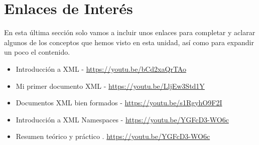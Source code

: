 \section{Enlaces de Interés}
En esta última sección solo vamos a incluir unos enlaces para completar y aclarar algunos de los conceptos que hemos visto en esta unidad, así como para expandir un poco el contenido.

\begin{itemize}
    \item Introducción a XML - \url{https://youtu.be/bCd2xaQrTAo}
    \item Mi primer documento XML - \url{https://youtu.be/LljEw3Std1Y}
    \item Documentos XML bien formados - \url{https://youtu.be/s1RgyhO9F2I}
    \item Introducción a XML Namespaces - \url{https://youtu.be/YGFcD3-WO6c}
    \item Resumen teórico y práctico . \url{https://youtu.be/YGFcD3-WO6c}
\end{itemize}



\glsaddall
\printglossaries


\newpage
{}



